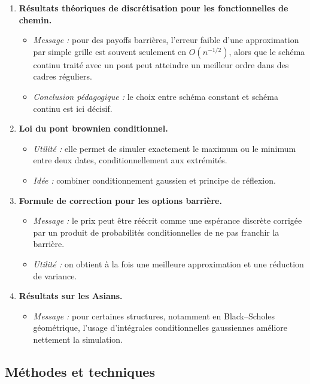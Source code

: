 \documentclass[11pt,a4paper]{article}
\begin{document}
\begin{enumerate}[label=\textbf{\arabic*.}]
  \item \textbf{Résultats théoriques de discrétisation pour les fonctionnelles de chemin.}
  \begin{itemize}
    \item \emph{Message :} pour des payoffs barrières, l'erreur faible d'une approximation par simple grille est souvent seulement en $O(n^{-1/2})$, alors que le schéma continu traité avec un pont peut atteindre un meilleur ordre dans des cadres réguliers.
    \item \emph{Conclusion pédagogique :} le choix entre schéma constant et schéma continu est ici décisif.
  \end{itemize}

  \item \textbf{Loi du pont brownien conditionnel.}
  \begin{itemize}
    \item \emph{Utilité :} elle permet de simuler exactement le maximum ou le minimum entre deux dates, conditionnellement aux extrémités.
    \item \emph{Idée :} combiner conditionnement gaussien et principe de réflexion.
  \end{itemize}

  \item \textbf{Formule de correction pour les options barrière.}
  \begin{itemize}
    \item \emph{Message :} le prix peut être réécrit comme une espérance discrète corrigée par un produit de probabilités conditionnelles de ne pas franchir la barrière.
    \item \emph{Utilité :} on obtient à la fois une meilleure approximation et une réduction de variance.
  \end{itemize}

  \item \textbf{Résultats sur les Asians.}
  \begin{itemize}
    \item \emph{Message :} pour certaines structures, notamment en Black--Scholes géométrique, l'usage d'intégrales conditionnelles gaussiennes améliore nettement la simulation.
  \end{itemize}
\end{enumerate}

\subsection{Méthodes et techniques}
\end{document}
